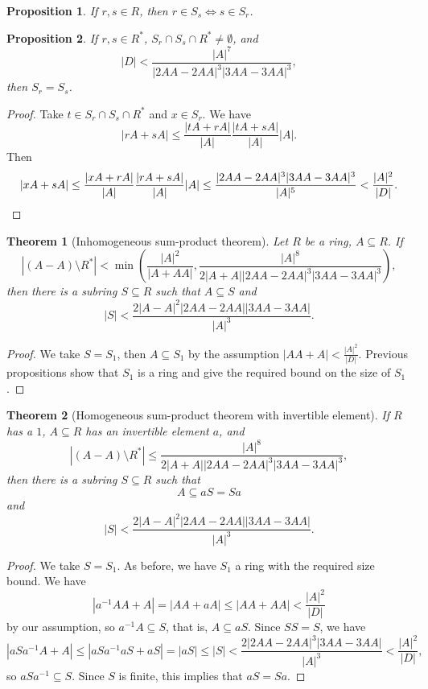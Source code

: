 \documentclass[letterpaper,11pt]{article}
\newtheorem{thm}{Theorem}
\newtheorem{prop}{Proposition}
\theoremstyle{definition}
\theoremstyle{remark}
\begin{document}
\begin{prop} If $r,s \in R$, then $r \in S_s \iff s \in S_r$.
\end{prop}

\begin{prop} If $r,s \in R^*$, $S_r \cap S_s \cap R^* \ne \emptyset$, and
\[
|D| < \frac{|A|^7}{|2AA-2AA|^3|3AA-3AA|^3},
\]
then $S_r = S_s$.
\end{prop}
\begin{proof} Take $t \in S_r \cap S_s \cap R^*$ and $x \in S_r$. We have
\[
|rA+sA| \le \frac{|tA+rA|}{|A|}\frac{|tA+sA|}{|A|}|A|.
\]
Then
\[
|xA+sA| \le \frac{|xA+rA|}{|A|}\frac{|rA+sA|}{|A|}|A| \le \frac{|2AA-2AA|^3|3AA-3AA|^3}{|A|^5} < \frac{|A|^2}{|D|}.\qedhere
\]
\end{proof}

\begin{thm}[Inhomogeneous sum-product theorem] Let $R$ be a ring, $A \subseteq R$. If
\[
|(A-A)\setminus R^*| < \min\left(\frac{|A|^2}{|A+AA|}, \frac{|A|^8}{2|A+A||2AA-2AA|^3|3AA-3AA|^3}\right),
\]
then there is a subring $S \subseteq R$ such that $A \subseteq S$ and
\[
|S| < \frac{2|A-A|^2|2AA-2AA||3AA-3AA|}{|A|^3}.
\]
\end{thm}
\begin{proof} We take $S = S_1$, then $A \subseteq S_1$ by the assumption $|AA+A| < \frac{|A|^2}{|D|}$. Previous propositions show that $S_1$ is a ring and give the required bound on the size of $S_1$.
\end{proof}

\begin{thm}[Homogeneous sum-product theorem with invertible element] If $R$ has a $1$, $A \subseteq R$ has an invertible element $a$, and
\[
|(A-A)\setminus R^*| \le \frac{|A|^8}{2|A+A||2AA-2AA|^3|3AA-3AA|^3},
\]
then there is a subring $S \subseteq R$ such that
\[
A \subseteq aS = Sa
\]
and
\[
|S| < \frac{2|A-A|^2|2AA-2AA||3AA-3AA|}{|A|^3}.
\]
\end{thm}
\begin{proof} We take $S = S_1$. As before, we have $S_1$ a ring with the required size bound. We have
\[
|a^{-1}AA+A| = |AA+aA| \le |AA+AA| < \frac{|A|^2}{|D|}
\]
by our assumption, so $a^{-1}A \subseteq S$, that is, $A \subseteq aS$. Since $SS = S$, we have
\[
|aSa^{-1}A+A| \le |aSa^{-1}aS+aS| = |aS| \le |S| < \frac{2|2AA-2AA|^3|3AA-3AA|}{|A|^3} < \frac{|A|^2}{|D|},
\]
so $aSa^{-1} \subseteq S$. Since $S$ is finite, this implies that $aS = Sa$.
\end{proof}


\nocite{big-garaev}
\nocite{bourgain-arbitrary}
\nocite{complex}
\nocite{garaev}
\nocite{kollar}
\nocite{petridis}
\nocite{point-plane}
\nocite{point-plane-app}
\nocite{schoen}
\nocite{slight}
\nocite{solymosi}
\nocite{ruzsa}
\nocite{tao}


\end{document}
